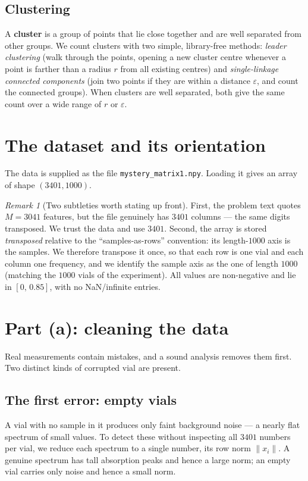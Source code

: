\documentclass[11pt]{article}
\newcommand{\norm}[1]{\lVert #1 \rVert}
\theoremstyle{definition}\newtheorem{definition}{Definition}[section]
\theoremstyle{plain}\newtheorem{proposition}{Proposition}[section]
\theoremstyle{remark}\newtheorem{remark}{Remark}[section]
\begin{document}
\subsection{Clustering}
A \textbf{cluster} is a group of points that lie close together and are well separated from
other groups. We count clusters with two simple, library-free methods: \emph{leader
clustering} (walk through the points, opening a new cluster centre whenever a point is farther
than a radius $r$ from all existing centres) and \emph{single-linkage connected components}
(join two points if they are within a distance $\varepsilon$, and count the connected groups).
When clusters are well separated, both give the same count over a wide range of $r$ or
$\varepsilon$.

\section{The dataset and its orientation}\label{sec:data}
The data is supplied as the file \texttt{mystery\_matrix1.npy}. Loading it gives an array of
shape $(3401,1000)$.

\begin{remark}[Two subtleties worth stating up front]
First, the problem text quotes $M=3041$ features, but the file genuinely has $3401$ columns ---
the same digits transposed. We trust the data and use $3401$. Second, the array is stored
\emph{transposed} relative to the ``samples-as-rows'' convention: its length-$1000$ axis is the
samples. We therefore transpose it once, so that each row is one vial and each column one
frequency, and we identify the sample axis as the one of length $1000$ (matching the $1000$
vials of the experiment). All values are non-negative and lie in $[0,\,0.85]$, with no
NaN/infinite entries.
\end{remark}

\section{Part (a): cleaning the data}\label{sec:3a}
Real measurements contain mistakes, and a sound analysis removes them first. Two distinct kinds
of corrupted vial are present.

\subsection{The first error: empty vials}
A vial with no sample in it produces only faint background noise --- a nearly flat spectrum of
small values. To detect these without inspecting all $3401$ numbers per vial, we reduce each
spectrum to a single number, its row norm $\norm{x_i}$. A genuine spectrum has tall absorption
peaks and hence a large norm; an empty vial carries only noise and hence a small norm.
\end{document}
